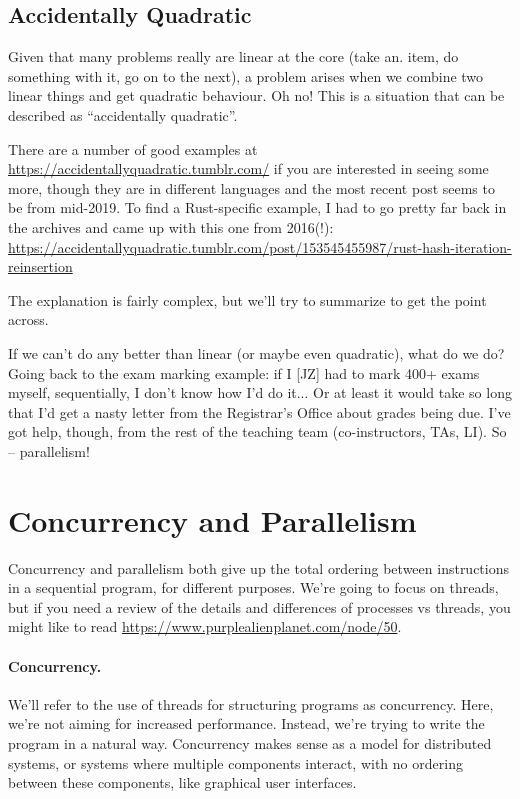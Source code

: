 \subsection*{Accidentally Quadratic}
Given that many problems really are linear at the core (take an. item, do something with it, go on to the next), a problem arises when we combine two linear things and get quadratic behaviour. Oh no! This is a situation that can be described as ``accidentally quadratic''.

There are a number of good examples at \url{https://accidentallyquadratic.tumblr.com/} if you are interested in seeing some more, though they are in different languages and the most recent post seems to be from mid-2019. To find a Rust-specific example, I had to go pretty far back in the archives and came up with this one from 2016(!): \url{https://accidentallyquadratic.tumblr.com/post/153545455987/rust-hash-iteration-reinsertion} 

The explanation is fairly complex, but we'll try to summarize to get the point across.

If we can't do any better than linear (or maybe even quadratic), what do we do? Going back to the exam marking example: if I [JZ] had to mark 400+ exams myself, sequentially, I don't know how I'd do it... Or at least it would take so long that I'd get a nasty letter from the Registrar's Office about grades being due. I've got help, though, from the rest of the teaching team (co-instructors, TAs, LI). So -- parallelism!

\section*{Concurrency and Parallelism}
Concurrency and parallelism both give up the
total ordering between instructions in a sequential program, for
different purposes. We're going to focus on threads, but if you need a review of the details and differences of processes vs threads, you might like to read   \url{https://www.purplealienplanet.com/node/50}. 

\paragraph{Concurrency.} We'll refer to the use of threads for
structuring programs as concurrency. Here, we're not aiming
for increased performance. Instead, we're trying to write the program
in a natural way. Concurrency makes sense as a model for distributed
systems, or systems where multiple components interact, with no ordering
between these components, like graphical user interfaces.

